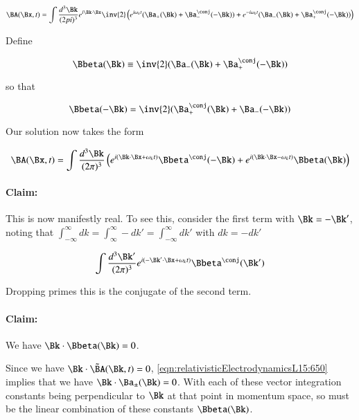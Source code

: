 \begin{equation}\label{eqn:relativisticElectrodynamicsL15:670}
\BA(\Bx, t) 
= \int \frac{d^3 \Bk}{(2 pi)^3} e^{i \Bk \cdot \Bx} 
\inv{2} \left( 
e^{i \omega_k t} (\Ba_{+}(\Bk) + \Ba_{-}^\conj(-\Bk)) 
+e^{-i \omega_k t} (\Ba_{-}(\Bk) + \Ba_{+}^\conj(-\Bk)) 
\right)
\end{equation}

Define

\begin{equation}\label{eqn:relativisticElectrodynamicsL15:690}
\Bbeta(\Bk) \equiv \inv{2} (\Ba_{-}(\Bk) + \Ba_{+}^\conj(-\Bk) )
\end{equation}

so that

\begin{equation}\label{eqn:relativisticElectrodynamicsL15:710}
\Bbeta(-\Bk) = \inv{2} (\Ba_{+}^\conj(\Bk) + \Ba_{-}(-\Bk))
\end{equation}

Our solution now takes the form

\begin{equation}\label{eqn:relativisticElectrodynamicsL15:730}
\BA(\Bx, t) = \int \frac{d^3\Bk}{(2 \pi)^3} \left( 
e^{i (\Bk \cdot \Bx + \omega_k t)} \Bbeta^\conj(-\Bk)
+e^{i (\Bk \cdot \Bx - \omega_k t)} \Bbeta(\Bk)
\right)
\end{equation}

\paragraph{Claim:}

This is now manifestly real.  To see this, consider the first term with $\Bk = -\Bk'$, noting that $\int_{-\infty}^\infty dk = \int_{\infty}^\infty -dk' = \int_{-\infty}^\infty dk' $ with $dk = -dk'$

\begin{equation}\label{eqn:relativisticElectrodynamicsL15:860}
\int \frac{d^3\Bk'}{(2 \pi)^3} e^{i (-\Bk' \cdot \Bx + \omega_k t)} \Bbeta^\conj(\Bk')
\end{equation}

Dropping primes this is the conjugate of the second term.

\paragraph{Claim:}

We have $\Bk \cdot \Bbeta(\Bk)  = 0$.

Since we have $\Bk \cdot \tilde{\BA}(\Bk, t) = 0$, \ref{eqn:relativisticElectrodynamicsL15:650} implies that we have $\Bk \cdot \Ba_{\pm}(\Bk) = 0$.  With each of these vector integration constants being perpendicular to $\Bk$ at that point in momentum space, so must be the linear combination of these constants $\Bbeta(\Bk)$.

\EndArticle
